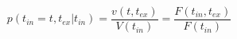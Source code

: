\begin{equation}
p(t_{in}=t,t_{ex}|t_{in})  = \frac{v(t,t_{ex})}{V(t_{in})}= \frac{F(t_{in},t_{ex})}{F(t_{in})}
\end{equation}